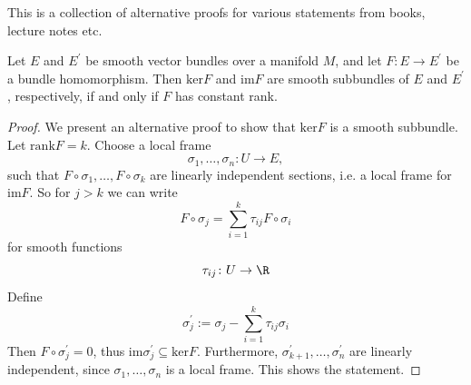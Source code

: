 This is a collection of alternative proofs for various statements from books, lecture notes etc.

\begin{theorem}
    Let $E$ and $E^\prime$ be smooth vector bundles over a manifold $M$, and let $F \colon E \to E^\prime$ be a bundle homomorphism. Then $\mathrm{ker} F$ and $\mathrm{im} F$ are smooth subbundles of $E$ and $E^\prime$, respectively, if and only if $F$ has constant rank.
\end{theorem}
\begin{proof}
    We present an alternative proof to show that $\mathrm{ker} F$ is a smooth subbundle. Let $\mathrm{rank} F = k$. Choose a local frame $$\sigma_1,\ldots,\sigma_n \colon U \to E,$$ such that $F\circ \sigma_1, \ldots, F \circ \sigma_k$ are linearly independent sections, i.e. a local frame for $\mathrm{im}F$. So for $j > k$ we can write
    \[
    F \circ \sigma_j = \sum_{i = 1}^k \tau_{ij} F \circ \sigma_i
    \]
    for smooth functions \[
    \tau_{ij} \colon U \to \R
    \]
    Define 
    \[
    \sigma_j^\prime := \sigma_j - \sum _{i=1}^k \tau_{ij} \sigma_i
    \]
    Then $F \circ \sigma_j^\prime = 0$, thus $\mathrm{im}\sigma_j^\prime \subseteq \mathrm{ker}F$. Furthermore, $\sigma_{k+1}^\prime,\ldots,\sigma_n^\prime$ are linearly independent, since $\sigma_1,\ldots,\sigma_n$ is a local frame. This shows the statement.
\end{proof}